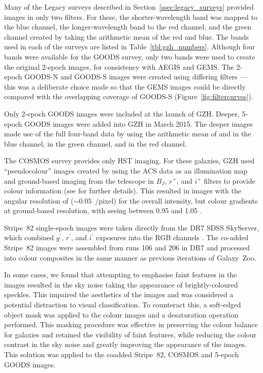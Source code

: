 \documentclass[a4paper,fleqn,usenatbib]{mnras}
\begin{document}
Many of the Legacy surveys described in Section~\ref{ssec:legacy_surveys}
provided \hst{} images in only two filters. For these, the shorter-wavelength band was
mapped to the blue channel, the longer-wavelength band to the red channel, and
the green channel created by taking the arithmetic mean of the red and blue. The bands
used in each of the surveys are listed in Table~\ref{tbl:gzh_numbers}.
Although four bands were available for the GOODS survey, only two bands were
used to create the original 2-epoch images, for consistency with AEGIS and
GEMS. The 2-epoch GOODS-N and GOODS-S images were created using differing
filters --- this was a deliberate choice made so that the GEMS images could be
directly compared with the overlapping coverage of GOODS-S
(Figure~\ref{fig:filtercurves}).

Only 2-epoch GOODS images were included at the launch of GZH.  Deeper, 5-epoch 
GOODS images were added into GZH in March 2015. The deeper images made
use of the full four-band data by using the arithmetic mean of \Bband{} and
\Vband{} in the blue channel, \Iband{} in the green channel, and \zband{} in
the red channel.

The COSMOS survey provides only \Iband{} HST imaging. For these galaxies, GZH
used ``pseudocolour'' images created by using the ACS \Iband{} data as an
illumination map and ground-based imaging from the \subaru{} telescope in
$B_J$, $r^+$, and $i^+$ filters to provide colour information (see
\citealt{gri12} for further details). This resulted in images with the angular
resolution of \hst{} ($\sim0.05$~\arcsec/pixel) for the overall intensity, but
colour gradients at ground-based resolution, with seeing between 0.95\arcsec{}
and 1.05\arcsec{} \citep{tan07}.

Stripe~82 single-epoch images were taken directly from the DR7 SDSS SkyServer,
which combined $g^{\prime}$, $r^{\prime}$, and $i^{\prime}$ exposures into the
RGB channels \citep{nie04}. The co-added Stripe~82 images were assembled from runs 106 and
206 in DR7 and processed into colour composites in the same manner as previous
iterations of Galaxy~Zoo.

In some cases, we found that attempting to emphasise faint features in the
images resulted in the sky noise taking the appearance of brightly-coloured
speckles. This impaired the aesthetics of the images and was considered a potential
distraction to visual classification.  To counteract this, a soft-edged object
mask was applied to the colour images and a desaturation operation performed.
This masking procedure was effective in preserving the colour balance for
galaxies and retained the visibility of faint features, while reducing the colour
contrast in the sky noise and greatly improving the appearance of the images.
This solution was applied to the coadded Stripe~82, COSMOS and 5-epoch GOODS
images.
\end{document}
